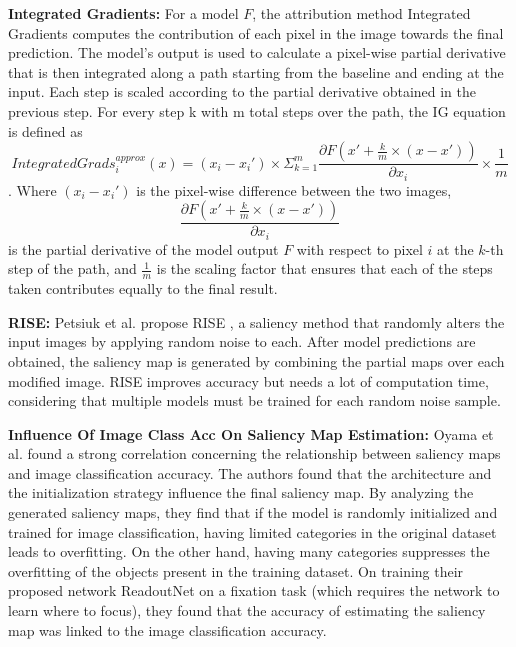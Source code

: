\textbf{Integrated Gradients: }
For a model $F$, the attribution method Integrated Gradients \cite{sundararajanAxiomaticAttributionDeep2017} computes the contribution of each pixel in the image towards the final prediction. The model's output is used to calculate a pixel-wise partial derivative that is then integrated along a path starting from the baseline and ending at the input. Each step is scaled according to the partial derivative obtained in the previous step. For every step k with m total steps over the path, the IG equation is defined as $$IntegratedGrads_i^{approx}(x) =(x_{i}-x_i')\times \Sigma_{k=1}^{m}\frac{\partial F(x' + \frac{k}{m} \times (x-x'))}{\partial x_{i}} \times \frac{1}{m}$$. Where $(x_{i} - x_{i}')$ is the pixel-wise difference between the two images, $$\frac{\partial F(x' + \frac{k}{m} \times (x-x'))}{\partial x_i}$$ is the partial derivative of the model output $F$ with respect to pixel $i$ at the $k$-th step of the path, and $\frac{1}{m}$ is the scaling factor that ensures that each of the steps taken contributes equally to the final result.

\textbf{RISE: }
Petsiuk et al. propose RISE \cite{petsiukRISERandomizedInput2018}, a saliency method that randomly alters the input images by applying random noise to each. After model predictions are obtained, the saliency map is generated by combining the partial maps over each modified image. RISE improves accuracy but needs a lot of computation time, considering that multiple models must be trained for each random noise sample.

\textbf{Influence Of Image Class Acc On Saliency Map Estimation: }
Oyama et al. \cite{oyamaInfluenceImageClassification2018} found a strong correlation concerning the relationship between saliency maps and image classification accuracy. The authors found that the architecture and the initialization strategy influence the final saliency map. By analyzing the generated saliency maps, they find that if the model is randomly initialized and trained for image classification, having limited categories in the original dataset leads to overfitting. On the other hand, having many categories suppresses the overfitting of the objects present in the training dataset. On training their proposed network ReadoutNet on a fixation task (which requires the network to learn where to focus), they found that the accuracy of estimating the saliency map was linked to the image classification accuracy.

